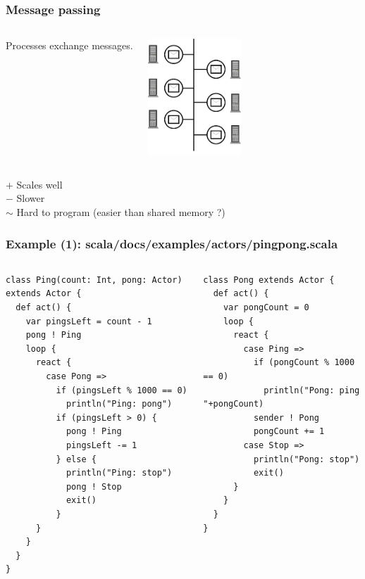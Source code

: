 \documentclass{beamer}
\theoremstyle{remark}
\theoremstyle{definition}
\begin{document}
\begin{frame}
  \frametitle{Message passing}
  
  \begin{columns}
  \column{5cm}
  Processes exchange messages.

  \column{5cm}
  \centering
  \includegraphics[width=3.5cm]{message}
  \end{columns}

  $+$ Scales well\\
  $-$ Slower \\
  $\sim$ Hard to program (easier than shared memory ?)
\end{frame}

\begin{frame}[fragile]
  \frametitle{Example (1): scala/docs/examples/actors/pingpong.scala}

  \begin{columns}
    \column{6cm}
{\tiny
\begin{verbatim}
class Ping(count: Int, pong: Actor) extends Actor {
  def act() {
    var pingsLeft = count - 1
    pong ! Ping
    loop {
      react {
        case Pong =>
          if (pingsLeft % 1000 == 0)
            println("Ping: pong")
          if (pingsLeft > 0) {
            pong ! Ping
            pingsLeft -= 1
          } else {
            println("Ping: stop")
            pong ! Stop
            exit()
          }
      }
    }
  }
}
\end{verbatim}
}

    \column{5cm}
{\tiny
\begin{verbatim}
class Pong extends Actor {
  def act() {
    var pongCount = 0
    loop {
      react {
        case Ping =>
          if (pongCount % 1000 == 0)
            println("Pong: ping "+pongCount)
          sender ! Pong
          pongCount += 1
        case Stop =>
          println("Pong: stop")
          exit()
      }
    }
  }
}
\end{verbatim}
}
  \end{columns}
\end{frame}
\end{document}
